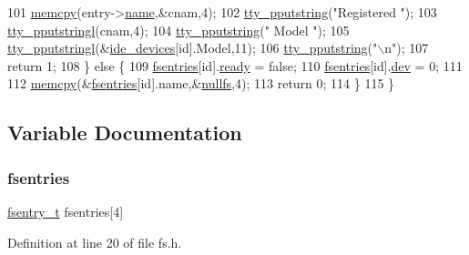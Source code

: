 \begin{DoxyCode}
101         \hyperlink{a00131_a370712322c794e949c996946f2283ea8_a370712322c794e949c996946f2283ea8}{memcpy}(entry->\hyperlink{a00272_a9c5a4f5b02eb2c9e9e797f79dc99028a_a9c5a4f5b02eb2c9e9e797f79dc99028a}{name},&cnam,4);
102         \hyperlink{a00179_ade960b1320324706aac6c00cc6b1b2fe_ade960b1320324706aac6c00cc6b1b2fe}{tty\_pputstring}(\textcolor{stringliteral}{"Registered "});
103         \hyperlink{a00179_abaf93f9e56ddb7b10462070f59e534e4_abaf93f9e56ddb7b10462070f59e534e4}{tty\_pputstringl}(cnam,4);
104         \hyperlink{a00179_ade960b1320324706aac6c00cc6b1b2fe_ade960b1320324706aac6c00cc6b1b2fe}{tty\_pputstring}(\textcolor{stringliteral}{" Model "});
105         \hyperlink{a00179_abaf93f9e56ddb7b10462070f59e534e4_abaf93f9e56ddb7b10462070f59e534e4}{tty\_pputstringl}(&\hyperlink{a00035_ab97a828ed4839b575dc382e2bf826e87_ab97a828ed4839b575dc382e2bf826e87}{ide\_devices}[\textcolor{keywordtype}{id}].Model,11);
106         \hyperlink{a00179_ade960b1320324706aac6c00cc6b1b2fe_ade960b1320324706aac6c00cc6b1b2fe}{tty\_pputstring}(\textcolor{stringliteral}{"\(\backslash\)n"});
107         \textcolor{keywordflow}{return} 1;
108     \} \textcolor{keywordflow}{else} \{
109         \hyperlink{a00152_a6b46131164b26e476762930c9aae4319_a6b46131164b26e476762930c9aae4319}{fsentries}[id].\hyperlink{a00272_a284522ed97fe1eeebd0fcc039b2ea00a_a284522ed97fe1eeebd0fcc039b2ea00a}{ready} = \textcolor{keyword}{false};
110         \hyperlink{a00152_a6b46131164b26e476762930c9aae4319_a6b46131164b26e476762930c9aae4319}{fsentries}[id].\hyperlink{a00272_aaea66ea744fa50f1c54666033884d8d2_aaea66ea744fa50f1c54666033884d8d2}{dev} = 0;
111 
112         \hyperlink{a00131_a370712322c794e949c996946f2283ea8_a370712322c794e949c996946f2283ea8}{memcpy}(&\hyperlink{a00152_a6b46131164b26e476762930c9aae4319_a6b46131164b26e476762930c9aae4319}{fsentries}[\textcolor{keywordtype}{id}].name,&\hyperlink{a00149_a36265ac74fd925405e1179e799961f1e_a36265ac74fd925405e1179e799961f1e}{nullfs},4);
113         \textcolor{keywordflow}{return} 0;
114     \} 
115 \}
\end{DoxyCode}


\subsection{Variable Documentation}
\mbox{\label{a00152_a6b46131164b26e476762930c9aae4319_a6b46131164b26e476762930c9aae4319}} 
\subsubsection{\texorpdfstring{fsentries}{fsentries}}
{\footnotesize\ttfamily \hyperlink{a00152_a9ccf6560e8aebea3e4402a31e8c0f46b_a9ccf6560e8aebea3e4402a31e8c0f46b}{fsentry\+\_\+t} fsentries\mbox{[}4\mbox{]}}



Definition at line 20 of file fs.\+h.

